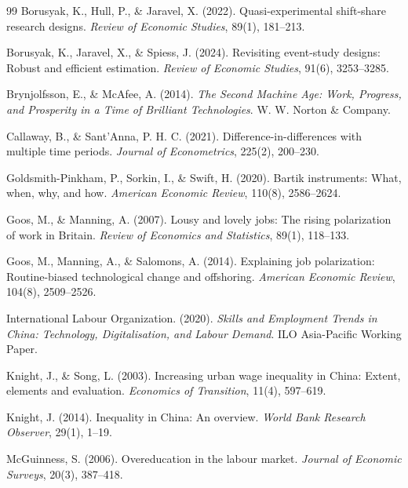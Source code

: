 \documentclass[12pt,a4paper]{article}
\theoremstyle{predstyle}
\theoremstyle{plain}
\begin{document}
\begin{thebibliography}{99}
Borusyak, K., Hull, P., \& Jaravel, X. (2022). Quasi-experimental shift-share research designs. \textit{Review of Economic Studies}, 89(1), 181--213.

Borusyak, K., Jaravel, X., \& Spiess, J. (2024). Revisiting event-study designs: Robust and efficient estimation. \textit{Review of Economic Studies}, 91(6), 3253--3285.

Brynjolfsson, E., \& McAfee, A. (2014). \textit{The Second Machine Age: Work, Progress, and Prosperity in a Time of Brilliant Technologies}. W. W. Norton \& Company.

Callaway, B., \& Sant'Anna, P. H. C. (2021). Difference-in-differences with multiple time periods. \textit{Journal of Econometrics}, 225(2), 200--230.

Goldsmith-Pinkham, P., Sorkin, I., \& Swift, H. (2020). Bartik instruments: What, when, why, and how. \textit{American Economic Review}, 110(8), 2586--2624.

Goos, M., \& Manning, A. (2007). Lousy and lovely jobs: The rising polarization of work in Britain. \textit{Review of Economics and Statistics}, 89(1), 118--133.

Goos, M., Manning, A., \& Salomons, A. (2014). Explaining job polarization: Routine-biased technological change and offshoring. \textit{American Economic Review}, 104(8), 2509--2526.

International Labour Organization. (2020). \textit{Skills and Employment Trends in China: Technology, Digitalisation, and Labour Demand}. ILO Asia-Pacific Working Paper.

Knight, J., \& Song, L. (2003). Increasing urban wage inequality in China: Extent, elements and evaluation. \textit{Economics of Transition}, 11(4), 597--619.

Knight, J. (2014). Inequality in China: An overview. \textit{World Bank Research Observer}, 29(1), 1--19.

McGuinness, S. (2006). Overeducation in the labour market. \textit{Journal of Economic Surveys}, 20(3), 387--418.


\end{thebibliography}
\end{document}
